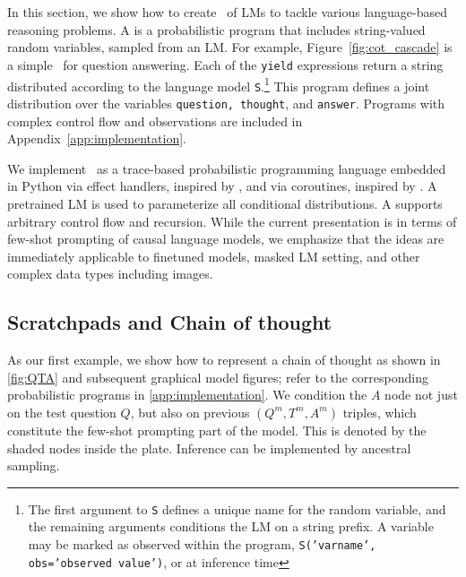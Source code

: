 \section{\Cascades}

In this section, we show how to create
\cascades\ of LMs to tackle various
language-based reasoning problems.
A \emph{\cascade} is a probabilistic program that includes
string-valued random variables, sampled from an LM.
For example, Figure~\ref{fig:cot_cascade} is a simple \cascade\ for question answering.
Each of the \texttt{yield} expressions return a string distributed according to the language model \texttt{S}.\footnote{The first argument
to \texttt{S} defines a unique name for the random variable,
and the remaining arguments conditions the LM on a string prefix. A variable may be marked as observed within the program, \texttt{S('varname', obs='observed value')}, or at inference time} This program defines a joint distribution over the variables \texttt{question, thought}, and \texttt{answer}.  Programs with complex control flow and observations are included in Appendix~\ref{app:implementation}.

We implement \cascades\ as a trace-based probabilistic programming language embedded in Python via effect handlers, inspired by \citet{pyro, numpyro}, and via coroutines, inspired by \citet{pymc4}. A pretrained LM is used to parameterize all conditional distributions. A \cascade supports arbitrary control flow and recursion. While the current presentation is in terms of few-shot prompting of causal language models, we emphasize that the ideas are immediately applicable to finetuned models, masked LM setting, and other complex data types including images.

\subsection{Scratchpads and Chain of thought}
\label{sec:QTA}

As our first example, we show how to 
 represent a chain of thought \citep{scratchpads, chainofthought} as shown in 
\cref{fig:QTA} and subsequent graphical model figures; refer to the corresponding probabilistic programs in \cref{app:implementation}.
We condition the $A$ node not just on the test question $Q$,
but also on previous $(Q^m,T^m,A^m)$ triples, which 
constitute the few-shot prompting part of the model.
This is denoted by the shaded nodes inside the plate.
Inference can be implemented by ancestral
sampling.

